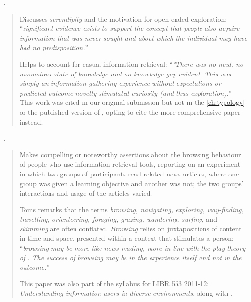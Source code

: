 \begin{sloppypar}
~\cite{Toms1999}. \end{sloppypar}

\begin{quotation}
    Discusses {\it serendipity} and the motivation for open-ended exploration: ``{\it significant evidence exists to support the concept that people also acquire information that was never sought and about which the individual may have had no predisposition.}''
    
    Helps to account for casual information retrieval: ``{\it "There was no need, no anomalous state of knowledge and no knowledge gap evident. This was simply an information gathering experience without expectations or predicted outcome novelty stimulated curiosity (and thus exploration).}''
    This work was cited in our original submission but not in the  \autoref{ch:typology} or the published version of \citet{Brehmer2013}, opting to cite the more comprehensive \citet{Toms2000} paper instead.
\end{quotation}

\begin{sloppypar}
~\cite{Toms2000}. \end{sloppypar}

\begin{quotation}
    Makes compelling or noteworthy assertions about the browsing behaviour of people who use information retrieval tools, reporting on an experiment in which two groups of participants read related news articles, where one group was given a learning objective and another was not; the two groups' interactions and usage of the articles varied.
    
    Toms remarks that the terms {\it browsing, navigating, exploring, way-finding, travelling, orienteering, foraging, grazing, wandering, surfing}, and {\it skimming} are often conflated. 
    {\it Browsing} relies on juxtapositions of content in time and space, presented within a context that stimulates a person; ``{\it browsing may be more like news reading, more in line with the play theory of \citet{Stephenson1967}. The success of browsing may be in the experience itself and not in the outcome.}''
    
    This paper was also part of the syllabus for LIBR 553 2011-12: {\it Understanding information users in diverse environments}, along with \citet{Case2008}.
\end{quotation}

